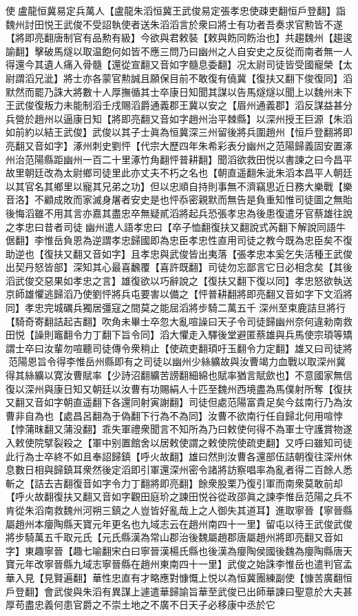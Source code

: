 使盧龍恒冀易定兵萬人【盧龍朱滔恒冀王武俊易定張孝忠使疎吏翻恒戶登翻】詣魏州討田悦王武俊不受詔執使者送朱滔滔言於衆曰將士有功者吾奏求官勲皆不遂【將即亮翻唐制官有品勲有級】今欲與君敕裝【敕與飭同飭治也】共趨魏州【趨逡諭翻】擊破馬燧以取温飽何如皆不應三問乃曰幽州之人自安史之反從而南者無一人得還今其遺人痛入骨髓【還從宣翻又音如字髓息委翻】况太尉司徒皆受國寵榮【太尉謂滔兄泚】將士亦各蒙官勲誠且願保目前不敢復有僥冀【復扶又翻下俊復同】滔默然而罷乃誅大將數十人厚撫循其士卒康日知聞其謀以告馬燧燧以聞上以魏州未下王武俊復叛力未能制滔壬戌賜滔爵通義郡王冀以安之【眉州通義郡】滔反謀益甚分兵營於趙州以逼康日知【將即亮翻又音如字趙州治平棘縣】以深州授王巨源【朱滔如前約以結王武俊】武俊以其子士眞為恒冀深三州留後將兵圍趙州【恒戶登翻將即亮翻又音如字】涿州刺史劉怦【代宗大歷四年朱希彩表分幽州之范陽歸義固安置涿州治范陽縣距幽州一百二十里涿竹角翻怦普耕翻】聞滔欲救田悦以書諫之曰今昌平故里朝廷改為太尉鄉司徒里此亦丈夫不朽之名也【朝直遥翻朱泚朱滔本昌平人朝廷以其官名其鄉里以寵其兄弟之功】但以忠順自持則事無不濟竊思近日務大樂戰【樂音洛】不顧成敗而家滅身屠者安史是也怦忝密親默而無告是負重知惟司徒圖之無貽後悔滔雖不用其言亦嘉其盡忠卒無疑貳滔將起兵恐張孝忠為後患復遣牙官蔡雄往說之孝忠曰昔者司徒幽州遣人語孝忠曰【卒子恤翻復扶又翻說式芮翻下解說同語牛倨翻】李惟岳負恩為逆謂孝忠歸國即為忠臣孝忠性直用司徒之教今既為忠臣矣不復助逆也【復扶又翻又音如字】且孝忠與武俊皆出夷落【張孝忠本奚乞失活種王武俊出契丹怒皆部】深知其心最喜飜覆【喜許既翻】司徒勿忘鄙言它日必相念矣【其後滔武俊交惡果如孝忠之言】雄復欲以巧辭說之【復扶又翻下復以同】孝忠怒欲執送京師雄懼逃歸滔乃使劉怦將兵屯要害以備之【怦普耕翻將即亮翻又音如字下文滔將同】孝忠完城礪兵獨居彊寇之間莫之能屈滔將步騎二萬五千深州至束鹿詰旦將行【騎奇寄翻詰起吉翻】吹角未畢士卒忽大亂喧譟曰天子令司徒歸幽州奈何違勑南救田悦【譟則竈翻令力丁翻下旨令同】滔大懼走入驛後堂避匿蔡雄與兵馬使宗頊等矯謂士卒曰汝輩勿喧聽司徒傳令衆稍止【使疏吏翻頊吁玉翻令力定翻】雄又曰司徒將范陽恩旨令得李惟岳州縣即有之司徒以幽州少絲纊故與汝曹竭力血戰以取深州冀得其絲纊以寛汝曹賦率【少詩沼翻纊苦謗翻細綿也賦率猶言賦歛也】不意國家無信復以深州與康日知又朝廷以汝曹有功賜絹人十匹至魏州西境盡為馬僕射所奪【復扶又翻又音如字朝直遥翻下各還同射寅謝翻】司徒但處范陽富貴足矣今兹南行乃為汝曹非自為也【處昌呂翻為于偽翻下行為不為同】汝曹不欲南行任自歸北何用喧悖【悖蒲昩翻又蒲没翻】乖失軍禮衆聞言不知所為乃曰敕使何得不為軍士守護賞物遂入敕使院擘裂殺之【軍中别置館舍以居敕使謂之敕使院使疏吏翻】又呼曰雖知司徒此行為士卒終不如且奉詔歸鎮【呼火故翻】雄曰然則汝曹各還部伍詰朝復往深州休息數日相與歸鎮耳衆然後定滔即引軍還深州密令諸將訪察唱率為亂者得二百餘人悉斬之【詰去吉翻復音如字令力丁翻將即亮翻】餘衆股栗乃復引軍而南衆莫敢前却【呼火故翻復扶又翻又音如字觀田庭玠之諫田悦谷從政邵眞之諫李惟岳范陽之兵不肯從朱滔南救魏州河朔三鎮之人豈皆好亂哉上之人御失其道耳】進取寧晉【寧晉縣屬趙州本癭陶縣天寶元年更名也九域志云在趙州南四十一里】留屯以待王武俊武俊將步騎萬五千取元氏【元氏縣漢為常山郡治後魏屬趙郡唐屬趙州將即亮翻又音如字】東趣寧晉【趣七喻翻宋白曰寧晉漢楊氏縣也後漢為癭陶侯國後魏為癭陶縣唐天寶元年改寧晉縣九域志寧晉縣在趙州東南四十一里】武俊之始誅李惟岳也遣判官孟華入見【見賢遍翻】華性忠直有才略應對慷慨上悦以為恒冀團練副使【慷苦廣翻恒戶登翻】會武俊與朱滔有異謀上遽遣華歸諭旨華至武俊已出師華諫曰聖意於大夫甚厚苟盡忠義何患官爵之不崇土地之不廣不日天子必移康中丞於它